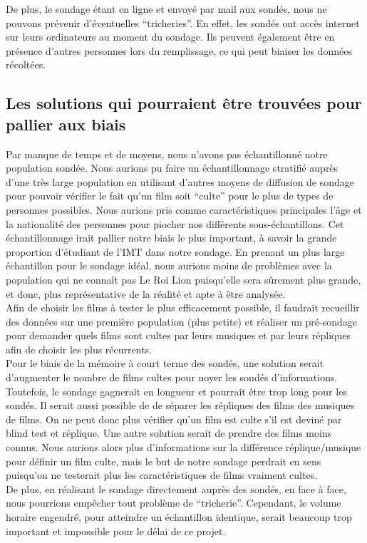 \documentclass{article} %
\begin{document}
De plus, le sondage étant en ligne et envoyé par mail aux sondés, nous ne pouvons prévenir d’éventuelles “tricheries”. En effet, les sondés ont accès internet sur leurs ordinateurs au moment du sondage. Ils peuvent également être en présence d’autres personnes lors du remplissage, ce qui peut biaiser les données récoltées.\\

\subsection{Les solutions qui pourraient être trouvées pour pallier aux biais}
Par manque de temps et de moyens, nous n’avons pas échantillonné notre population sondée. Nous aurions pu faire un échantillonnage stratifié auprès d’une très large population en utilisant d’autres moyens de diffusion de sondage pour pouvoir vérifier le fait qu’un film soit “culte” pour le plus de types de personnes possibles. Nous aurions pris comme caractéristiques principales l’âge et la nationalité des personnes pour piocher nos différents sous-échantillons. Cet échantillonnage irait pallier notre biais le plus important, à savoir la grande proportion d’étudiant de l’IMT dans notre sondage. En prenant un plus large échantillon pour le sondage idéal, nous aurions moins de problèmes avec la population qui ne connaît pas Le Roi Lion puisqu'elle sera sûrement plus grande, et donc, plus représentative de la réalité et apte à être analysée.\\
Afin de choisir les films à tester le plus efficacement possible, il faudrait recueillir des données sur une première population (plus petite) et réaliser un pré-sondage pour demander quels films sont cultes par leurs musiques et par leurs répliques afin de choisir les plus récurrents.\\
Pour le biais de la mémoire à court terme des sondés, une solution serait d’augmenter le nombre de films cultes pour noyer les sondés d’informations. Toutefois, le sondage gagnerait en longueur et pourrait être trop long pour les sondés. Il serait aussi possible de de séparer les répliques des films des musiques de films. On ne peut donc plus vérifier qu’un film est culte s’il est deviné par blind test et réplique. Une autre solution serait de prendre des films moins connus. Nous aurions alors plus d’informations sur la différence réplique/musique pour définir un film culte, mais le but de notre sondage perdrait en sens puisqu’on ne testerait plus les caractéristiques de films vraiment cultes.\\
De plus, en réalisant le sondage directement auprès des sondés, en face à face, nous pourrions empêcher tout problème de “tricherie”. Cependant, le volume horaire engendré, pour atteindre un échantillon identique, serait beaucoup trop important et impossible pour le délai de ce projet.
\end{document}

